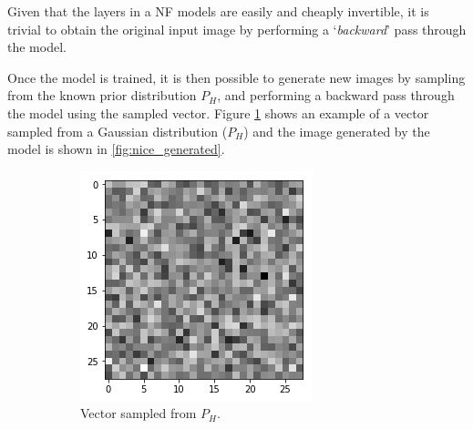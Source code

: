 Given that the layers in a NF models are easily and cheaply invertible, it is trivial to obtain the original input image by performing a `\textit{backward}' pass through the model. 

Once the model is trained, it is then possible to generate new images by sampling from the known prior distribution $P_H$, and performing a backward pass through the model using the sampled vector. Figure \ref{fig:nice_sample} shows an example of a vector sampled from a Gaussian distribution ($P_H$) and the image generated by the model is shown in \ref{fig:nice_generated}.

\begin{figure}[htbp!]
     \centering
     \begin{subfigure}[b]{0.45\textwidth}
         \centering
         \includegraphics[width=\textwidth]{Images/sample.png}
         \caption{Vector sampled from $P_H$.}
         \label{fig:nice_sample}
     \end{subfigure} 
     \hfill
     \begin{subfigure}[b]{0.45\textwidth}
         \centering

\end{subfigure}
\end{figure}
